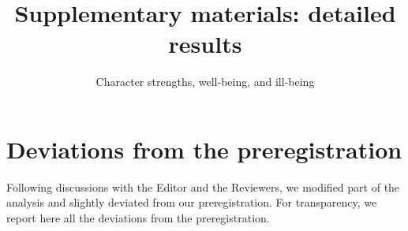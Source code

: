 \documentclass[
  letterpaper,
  DIV=11,
  numbers=noendperiod]{scrartcl}
\title{Supplementary materials: detailed results}
\subtitle{Character strengths, well-being, and ill-being}
\author{}
\date{}
\renewcommand*\contentsname{Table of contents}
\newcommand\contentsname{Table of contents}
\begin{document}
\maketitle
\ifdefined\Shaded\renewenvironment{Shaded}{\begin{tcolorbox}[borderline west={3pt}{0pt}{shadecolor}, frame hidden, breakable, interior hidden, boxrule=0pt, enhanced, sharp corners]}{\end{tcolorbox}}\fi

\renewcommand*\contentsname{Table of contents}
{
\hypersetup{linkcolor=}
\setcounter{tocdepth}{3}
\tableofcontents
}
\newpage

\hypertarget{deviations-from-the-preregistration}{%
\section{Deviations from the
preregistration}\label{deviations-from-the-preregistration}}

Following discussions with the Editor and the Reviewers, we modified
part of the analysis and slightly deviated from our preregistration. For
transparency, we report here all the deviations from the
preregistration.
\end{document}
